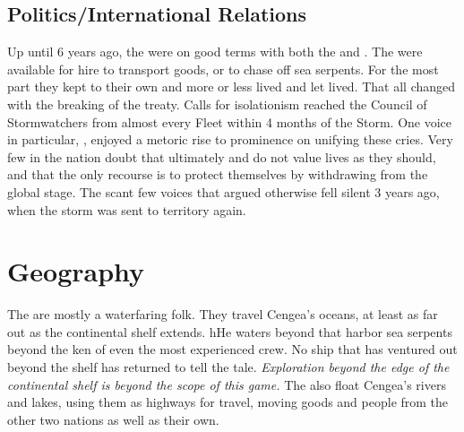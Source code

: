 \documentclass[blue]{GL2020}
\begin{document}


\subsection*{Politics/International Relations}
Up until 6 years ago, the \pShip{} were on good terms with both the \pFarm{} and \pTech{}. The \pShippies{} were available for hire to transport goods, or to chase off sea serpents. For the most part they kept to their own and more or less lived and let lived. That all changed with the breaking of the treaty. Calls for isolationism reached the Council of Stormwatchers from almost every Fleet within 4 months of the Storm. One voice in particular, \cLoud{}, enjoyed a metoric rise to prominence on unifying these cries. Very few in the nation doubt that ultimately \pFarm{} and \pTech{} do not value \pShip{} lives as they should, and that the only recourse is to protect themselves by withdrawing from the global stage. The scant few voices that argued otherwise fell silent 3 years ago, when the storm was sent to \pShip{} territory again.

\section*{Geography}
The \pShip{} are mostly a waterfaring folk. They travel Cengea's oceans, at least as far out as the continental shelf extends. hHe waters beyond that harbor sea serpents beyond the ken of even the most experienced \pShippies{} crew. No ship that has ventured out beyond the shelf has returned to tell the tale. \emph{Exploration beyond the edge of the continental shelf is beyond the scope of this game.} The \pShippies{} also float Cengea's rivers and lakes, using them as highways for travel, moving goods and people from the other two nations as well as their own.
\end{document}
